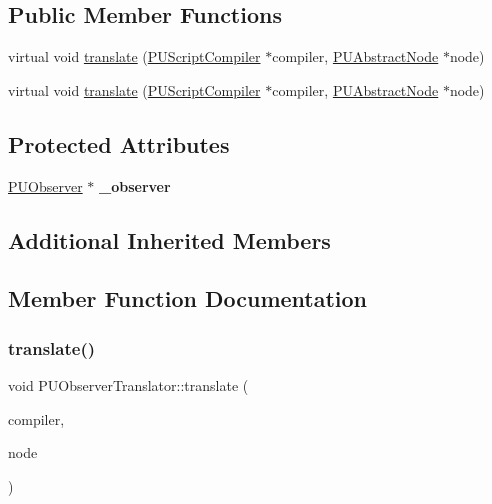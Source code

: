 \subsection*{Public Member Functions}
\begin{DoxyCompactItemize}
\item 
virtual void \hyperlink{classPUObserverTranslator_a81e39efa2b6af4b4aeddc59da0363cf9}{translate} (\hyperlink{classPUScriptCompiler}{P\+U\+Script\+Compiler} $\ast$compiler, \hyperlink{classPUAbstractNode}{P\+U\+Abstract\+Node} $\ast$node)
\item 
virtual void \hyperlink{classPUObserverTranslator_a06d960394aa02aecdc5208c0aefb18ac}{translate} (\hyperlink{classPUScriptCompiler}{P\+U\+Script\+Compiler} $\ast$compiler, \hyperlink{classPUAbstractNode}{P\+U\+Abstract\+Node} $\ast$node)
\end{DoxyCompactItemize}
\subsection*{Protected Attributes}
\begin{DoxyCompactItemize}
\item 
\mbox{\label{classPUObserverTranslator_acee446c80b0b4b29c5c5168f310b3893}} 
\hyperlink{classPUObserver}{P\+U\+Observer} $\ast$ {\bfseries \+\_\+observer}
\end{DoxyCompactItemize}
\subsection*{Additional Inherited Members}


\subsection{Member Function Documentation}
\mbox{\label{classPUObserverTranslator_a81e39efa2b6af4b4aeddc59da0363cf9}} 
\subsubsection{\texorpdfstring{translate()}{translate()}\hspace{0.1cm}{\footnotesize\ttfamily [1/2]}}
{\footnotesize\ttfamily void P\+U\+Observer\+Translator\+::translate (\begin{DoxyParamCaption}\item[{\hyperlink{classPUScriptCompiler}{P\+U\+Script\+Compiler} $\ast$}]{compiler,  }\item[{\hyperlink{classPUAbstractNode}{P\+U\+Abstract\+Node} $\ast$}]{node }\end{DoxyParamCaption})\hspace{0.3cm}{\ttfamily [virtual]}}


